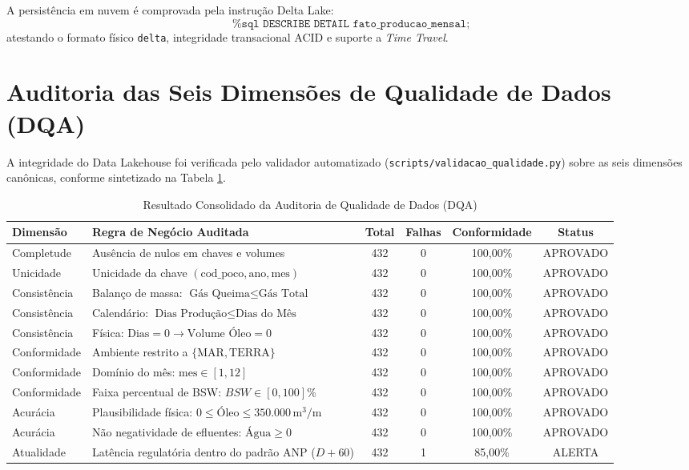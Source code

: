\documentclass[12pt,a4paper]{article}
\begin{document}
A persistência em nuvem é comprovada pela instrução Delta Lake:
\begin{equation}
    \texttt{\%sql DESCRIBE DETAIL fato\_producao\_mensal;}
\end{equation}
atestando o formato físico \texttt{delta}, integridade transacional ACID e suporte a \textit{Time Travel}.

\section{Auditoria das Seis Dimensões de Qualidade de Dados (DQA)}

A integridade do Data Lakehouse foi verificada pelo validador automatizado (\texttt{scripts/validacao\_qualidade.py}) sobre as seis dimensões canônicas, conforme sintetizado na Tabela \ref{tab:dqa}.

\begin{table}[htbp]
\centering
\small
\caption{Resultado Consolidado da Auditoria de Qualidade de Dados (DQA)}
\label{tab:dqa}
\begin{tabular}{llcccc}
\toprule
\textbf{Dimensão} & \textbf{Regra de Negócio Auditada} & \textbf{Total} & \textbf{Falhas} & \textbf{Conformidade} & \textbf{Status} \\
\midrule
Completude & Ausência de nulos em chaves e volumes & 432 & 0 & 100,00\% & APROVADO \\
Unicidade & Unicidade da chave $(\text{cod\_poco}, \text{ano}, \text{mes})$ & 432 & 0 & 100,00\% & APROVADO \\
Consistência & Balanço de massa: $\text{Gás Queima} \le \text{Gás Total}$ & 432 & 0 & 100,00\% & APROVADO \\
Consistência & Calendário: $\text{Dias Produção} \le \text{Dias do Mês}$ & 432 & 0 & 100,00\% & APROVADO \\
Consistência & Física: $\text{Dias} = 0 \rightarrow \text{Volume Óleo} = 0$ & 432 & 0 & 100,00\% & APROVADO \\
Conformidade & Ambiente restrito a $\{\text{MAR}, \text{TERRA}\}$ & 432 & 0 & 100,00\% & APROVADO \\
Conformidade & Domínio do mês: $\text{mes} \in [1, 12]$ & 432 & 0 & 100,00\% & APROVADO \\
Conformidade & Faixa percentual de BSW: $BSW \in [0, 100]\%$ & 432 & 0 & 100,00\% & APROVADO \\
Acurácia & Plausibilidade física: $0 \le \text{Óleo} \le 350.000\,\text{m}^3/\text{m}$ & 432 & 0 & 100,00\% & APROVADO \\
Acurácia & Não negatividade de efluentes: $\text{Água} \ge 0$ & 432 & 0 & 100,00\% & APROVADO \\
Atualidade & Latência regulatória dentro do padrão ANP ($D+60$) & 432 & 1 & 85,00\% & ALERTA \\
\bottomrule
\end{tabular}
\end{table}
\end{document}
